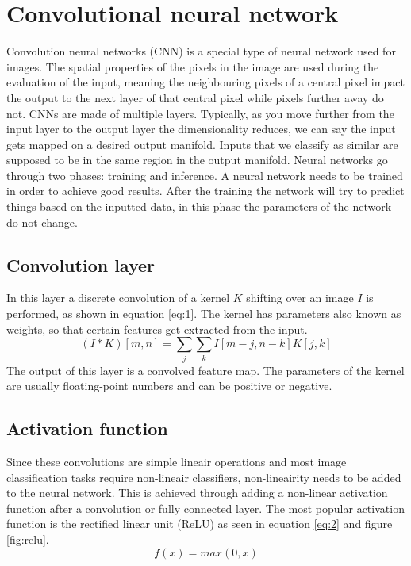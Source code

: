 \section{Convolutional neural network}
Convolution neural networks (CNN) is a special type of neural network used for images. The spatial properties of the pixels in the image are used during the evaluation of the input, meaning the neighbouring pixels of a central pixel impact the output to the next layer of that central pixel while pixels further away do not.
CNNs are made of multiple layers. Typically, as you move further from the input layer to the output layer the dimensionality reduces, we can say the input gets mapped on a desired output manifold. Inputs that we classify as similar are supposed to be in the same region in the output manifold. Neural networks go through two phases: training and inference. A neural network needs to be trained in order to achieve good results. After the training the network will try to predict things based on the inputted data, in this phase the parameters of the network do not change.

\subsection{Convolution layer}
In this layer a discrete convolution of a kernel $K$ shifting over an image $I$ is performed, as shown in equation \ref{eq:1}. The kernel has parameters also known as weights, so that certain features get extracted from the input.
\begin{equation} \label{eq:1}
  (I*K)[m,n]=\sum_j\sum_k I[m-j,n-k]K[j,k]
\end{equation}
The output of this layer is a convolved feature map. The parameters of the kernel are usually floating-point numbers and can be positive or negative.

\subsection{Activation function}
Since these convolutions are simple lineair operations and most image classification tasks require non-lineair classifiers, non-lineairity needs to be added to the neural network. This is achieved through adding a non-linear activation function after a convolution or fully connected layer. The most popular activation function is the rectified linear unit (ReLU) as seen in equation \ref{eq:2} and figure \ref{fig:relu}.
\begin{equation} \label{eq:2}
  f(x)=max(0,x)
\end{equation}

